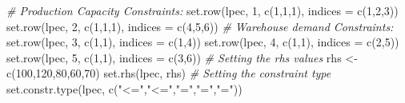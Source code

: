 \documentclass[
]{article}
\newenvironment{Shaded}{\begin{snugshade}}{\end{snugshade}}
\newcommand{\AttributeTok}[1]{\textcolor[rgb]{0.77,0.63,0.00}{#1}}
\newcommand{\CommentTok}[1]{\textcolor[rgb]{0.56,0.35,0.01}{\textit{#1}}}
\newcommand{\DecValTok}[1]{\textcolor[rgb]{0.00,0.00,0.81}{#1}}
\newcommand{\FunctionTok}[1]{\textcolor[rgb]{0.00,0.00,0.00}{#1}}
\newcommand{\NormalTok}[1]{#1}
\newcommand{\OtherTok}[1]{\textcolor[rgb]{0.56,0.35,0.01}{#1}}
\newcommand{\StringTok}[1]{\textcolor[rgb]{0.31,0.60,0.02}{#1}}
\begin{document}
\begin{Shaded}
\begin{Highlighting}[]
\CommentTok{\# Production Capacity Constraints:}
\FunctionTok{set.row}\NormalTok{(lpec, }\DecValTok{1}\NormalTok{, }\FunctionTok{c}\NormalTok{(}\DecValTok{1}\NormalTok{,}\DecValTok{1}\NormalTok{,}\DecValTok{1}\NormalTok{), }\AttributeTok{indices =} \FunctionTok{c}\NormalTok{(}\DecValTok{1}\NormalTok{,}\DecValTok{2}\NormalTok{,}\DecValTok{3}\NormalTok{))}
\FunctionTok{set.row}\NormalTok{(lpec, }\DecValTok{2}\NormalTok{, }\FunctionTok{c}\NormalTok{(}\DecValTok{1}\NormalTok{,}\DecValTok{1}\NormalTok{,}\DecValTok{1}\NormalTok{), }\AttributeTok{indices =} \FunctionTok{c}\NormalTok{(}\DecValTok{4}\NormalTok{,}\DecValTok{5}\NormalTok{,}\DecValTok{6}\NormalTok{))}
\CommentTok{\# Warehouse demand Constraints:}
\FunctionTok{set.row}\NormalTok{(lpec, }\DecValTok{3}\NormalTok{, }\FunctionTok{c}\NormalTok{(}\DecValTok{1}\NormalTok{,}\DecValTok{1}\NormalTok{), }\AttributeTok{indices =} \FunctionTok{c}\NormalTok{(}\DecValTok{1}\NormalTok{,}\DecValTok{4}\NormalTok{))}
\FunctionTok{set.row}\NormalTok{(lpec, }\DecValTok{4}\NormalTok{, }\FunctionTok{c}\NormalTok{(}\DecValTok{1}\NormalTok{,}\DecValTok{1}\NormalTok{), }\AttributeTok{indices =} \FunctionTok{c}\NormalTok{(}\DecValTok{2}\NormalTok{,}\DecValTok{5}\NormalTok{))}
\FunctionTok{set.row}\NormalTok{(lpec, }\DecValTok{5}\NormalTok{, }\FunctionTok{c}\NormalTok{(}\DecValTok{1}\NormalTok{,}\DecValTok{1}\NormalTok{), }\AttributeTok{indices =} \FunctionTok{c}\NormalTok{(}\DecValTok{3}\NormalTok{,}\DecValTok{6}\NormalTok{))}
\CommentTok{\# Setting the rhs values}
\NormalTok{rhs }\OtherTok{\textless{}{-}} \FunctionTok{c}\NormalTok{(}\DecValTok{100}\NormalTok{,}\DecValTok{120}\NormalTok{,}\DecValTok{80}\NormalTok{,}\DecValTok{60}\NormalTok{,}\DecValTok{70}\NormalTok{)}
\FunctionTok{set.rhs}\NormalTok{(lpec, rhs)}
\CommentTok{\# Setting the constraint type}
\FunctionTok{set.constr.type}\NormalTok{(lpec, }\FunctionTok{c}\NormalTok{(}\StringTok{"\textless{}="}\NormalTok{,}\StringTok{"\textless{}="}\NormalTok{,}\StringTok{"="}\NormalTok{,}\StringTok{"="}\NormalTok{,}\StringTok{"="}\NormalTok{))}
\end{Highlighting}
\end{Shaded}
\end{document}
